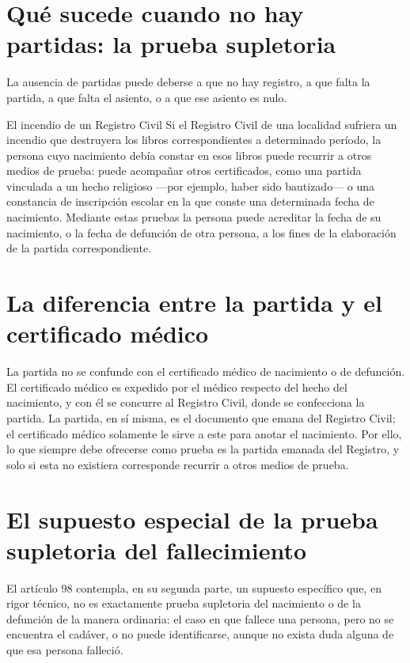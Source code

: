 \documentclass[12pt,oneside]{book}
\begin{document}
\section{Qué sucede cuando no hay partidas: la prueba supletoria}

La ausencia de partidas puede deberse a que no hay registro, a que falta la partida, a que falta el asiento, o a que ese asiento es nulo.

\begin{example}{El incendio de un Registro Civil}
Si el Registro Civil de una localidad sufriera un incendio que destruyera los libros correspondientes a determinado período, la persona cuyo nacimiento debía constar en esos libros puede recurrir a otros medios de prueba: puede acompañar otros certificados, como una partida vinculada a un hecho religioso —por ejemplo, haber sido bautizado— o una constancia de inscripción escolar en la que conste una determinada fecha de nacimiento. Mediante estas pruebas la persona puede acreditar la fecha de su nacimiento, o la fecha de defunción de otra persona, a los fines de la elaboración de la partida correspondiente.
\end{example}

\section{La diferencia entre la partida y el certificado médico}

\begin{note}
La partida no se confunde con el certificado médico de nacimiento o de defunción. El certificado médico es expedido por el médico respecto del hecho del nacimiento, y con él se concurre al Registro Civil, donde se confecciona la partida. La partida, en sí misma, es el documento que emana del Registro Civil; el certificado médico solamente le sirve a este para anotar el nacimiento. Por ello, lo que siempre debe ofrecerse como prueba es la partida emanada del Registro, y solo si esta no existiera corresponde recurrir a otros medios de prueba.
\end{note}

\section{El supuesto especial de la prueba supletoria del fallecimiento}

El artículo 98 contempla, en su segunda parte, un supuesto específico que, en rigor técnico, no es exactamente prueba supletoria del nacimiento o de la defunción de la manera ordinaria: el caso en que fallece una persona, pero no se encuentra el cadáver, o no puede identificarse, aunque no exista duda alguna de que esa persona falleció.
\end{document}
